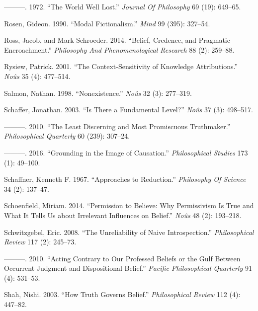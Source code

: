 \documentclass[
  10pt,
  letterpaper,
  DIV=11,
  numbers=noendperiod,
  twoside]{scrartcl}
\newlength{\cslhangindent}
\newenvironment{CSLReferences}[2] %
 {\begin{list}{}{%
  \setlength{\itemindent}{0pt}
  \setlength{\leftmargin}{0pt}
  \setlength{\parsep}{0pt}
  \ifodd #1
   \setlength{\leftmargin}{\cslhangindent}
   \setlength{\itemindent}{-1\cslhangindent}
  \fi
  \setlength{\itemsep}{#2\baselineskip}}}
 {\end{list}}
\begin{document}
\begin{CSLReferences}{1}{0}
---------. 1972. {``The World Well Lost.''} \emph{Journal Of Philosophy}
69 (19): 649--65.

Rosen, Gideon. 1990. {``Modal Fictionalism.''} \emph{Mind} 99 (395):
327--54.

Ross, Jacob, and Mark Schroeder. 2014. {``Belief, Credence, and
Pragmatic Encroachment.''} \emph{Philosophy And Phenomenological
Research} 88 (2): 259--88.

Rysiew, Patrick. 2001. {``The Context-Sensitivity of Knowledge
Attributions.''} \emph{Noûs} 35 (4): 477--514.

Salmon, Nathan. 1998. {``Nonexistence.''} \emph{Noûs} 32 (3): 277--319.

Schaffer, Jonathan. 2003. {``Is There a Fundamental Level?''}
\emph{Noûs} 37 (3): 498--517.

---------. 2010. {``The Least Discerning and Most Promiscuous
Truthmaker.''} \emph{Philosophical Quarterly} 60 (239): 307--24.

---------. 2016. {``Grounding in the Image of Causation.''}
\emph{Philosophical Studies} 173 (1): 49--100.

Schaffner, Kenneth F. 1967. {``Approaches to Reduction.''}
\emph{Philosophy Of Science} 34 (2): 137--47.

Schoenfield, Miriam. 2014. {``Permission to Believe: Why Permissivism Is
True and What It Tells Us about Irrelevant Influences on Belief.''}
\emph{Noûs} 48 (2): 193--218.

Schwitzgebel, Eric. 2008. {``The Unreliability of Naive
Introspection.''} \emph{Philosophical Review} 117 (2): 245--73.

---------. 2010. {``Acting Contrary to Our Professed Beliefs or the Gulf
Between Occurrent Judgment and Dispositional Belief.''} \emph{Pacific
Philosophical Quarterly} 91 (4): 531--53.

Shah, Nishi. 2003. {``How Truth Governs Belief.''} \emph{Philosophical
Review} 112 (4): 447--82.


\end{CSLReferences}
\end{document}
